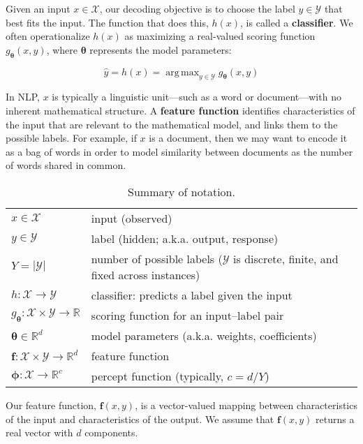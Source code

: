 \documentclass[11pt,letterpaper]{article}
\DeclareMathOperator*{\argmax}{arg\,max}
\newcommand{\params}{\mathbf{\theta}}
\begin{document}
Given an input $x \in \mathcal{X}$, our decoding objective is 
to choose the label $y \in \mathcal{Y}$ that best fits the input. 
The function that does this, $h(x)$, is called a \textbf{classifier}.
We often operationalize $h(x)$ as maximizing a real-valued scoring function $g_\params(x,y)$, 
where $\params$ represents the model parameters: 

\begin{equation}\label{eq:classifier}
\hat{y} = h(x) = \argmax_{y\in\mathcal{Y}} g_\params(x,y)
\end{equation}

In NLP, $x$ is typically a linguistic unit---such as a word or document---with no inherent mathematical structure. 
A {\bf feature function} identifies characteristics of the input that are relevant to the mathematical model, 
and links them to the possible labels. 
For example, if $x$ is a document, then we may want to encode it as a bag of words 
in order to model similarity between documents as the number of words shared in common.

\begin{table*}\small
\begin{tabular}{ll}
$x \in \mathcal{X}$ & input (observed) \\
$y \in \mathcal{Y}$ & label (hidden; a.k.a. output, response) \\
$Y = |\mathcal{Y}|$ & number of possible labels ($\mathcal{Y}$ is discrete, finite, and fixed across instances) \\
$h: \mathcal{X}\rightarrow\mathcal{Y}$ & classifier: predicts a label given the input \\
$g_\params: \mathcal{X}\times\mathcal{Y}\rightarrow\mathbb{R}$ & scoring function for an input--label pair \\
$\boldsymbol{\theta} \in \mathbb{R}^d$ & model parameters (a.k.a. weights, coefficients) \\
$\mathbf{f}: \mathcal{X}\times\mathcal{Y}\rightarrow\mathbb{R}^d$ & feature function \\
$\boldsymbol{\phi}: \mathcal{X}\rightarrow\mathbb{R}^c$ & percept function (typically, $c = d/Y$) \\
\end{tabular}
\caption{Summary of notation.}
\label{tbl:notation}
\end{table*}


Our feature function, $\mathbf{f}(x,y)$, is a vector-valued mapping between 
characteristics of the input and characteristics of the output.
We assume that $\mathbf{f}(x,y)$ returns a real vector with $d$ components.
\end{document}
